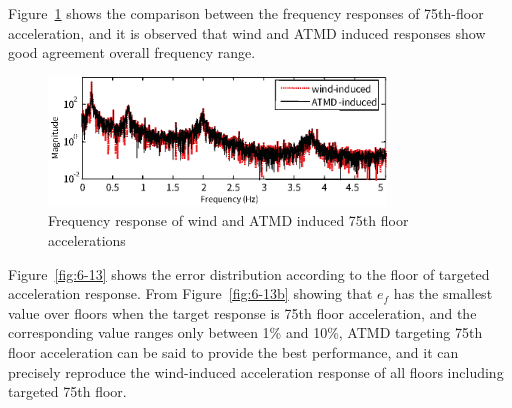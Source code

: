Figure~\ref{fig:6-12} shows the comparison between the frequency responses of 75th-floor acceleration, and it is observed that wind and ATMD induced responses show good agreement overall frequency range. 

\begin{figure}[ht]
\centering
\includegraphics[width=0.8\textwidth] {figure/6-12.eps}
\caption{Frequency response of wind and ATMD induced 75th floor accelerations}
\label{fig:6-12}
\end{figure}

Figure~\ref{fig:6-13} shows the error distribution according to the floor of targeted acceleration response. From Figure~\ref{fig:6-13b} showing that $e_{f}$ has the smallest value over floors when the target response is 75th floor acceleration, and the corresponding value ranges only between 1\% and 10\%, ATMD targeting 75th floor acceleration can be said to provide the best performance, and it can precisely reproduce the wind-induced acceleration response of all floors including targeted 75th floor.

